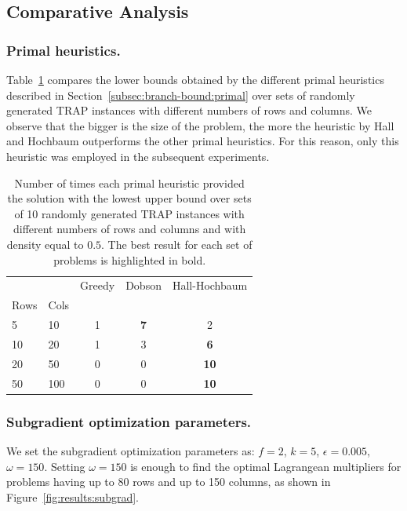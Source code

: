 \documentclass[runningheads]{llncs}
\begin{document}
\subsection{Comparative Analysis}
\label{subsec:results:comparisons}

\subsubsection{Primal heuristics.} Table~\ref{tab:results:primal} compares the lower bounds obtained by the different primal heuristics described in Section~\ref{subsec:branch-bound:primal} over sets of randomly generated TRAP instances with different numbers of rows and columns. We observe that the bigger is the size of the problem, the more the heuristic by Hall and Hochbaum outperforms the other primal heuristics. For this reason, only this heuristic was employed in the subsequent experiments. 

\begin{table}
  \caption{Number of times each primal heuristic provided the solution with the lowest upper bound over sets of 10 randomly generated TRAP instances with different numbers of rows and columns and with density equal to $0.5$. The best result for each set of problems is highlighted in bold.}
  \label{tab:results:primal}
  \centering
  \begin{tabular}{llccc}
  \toprule
   &  & Greedy & Dobson & Hall-Hochbaum \\
  Rows & Cols &  &  &  \\
  \midrule
  5 & 10 & 1 & \bfseries 7 & 2 \\
  10 & 20 & 1 & 3 & \bfseries 6 \\
  20 & 50 & 0 & 0 & \bfseries 10 \\
  50 & 100 & 0 & 0 & \bfseries 10 \\
  \bottomrule
  \end{tabular}
  \end{table}

\subsubsection{Subgradient optimization parameters.} We set the subgradient optimization parameters as: $f=2$, $k=5$, $\epsilon=0.005$, $\omega=150$. Setting $\omega=150$ is enough to find the optimal Lagrangean multipliers for problems having up to 80 rows and up to 150 columns, as shown in Figure~\ref{fig:results:subgrad}.
\end{document}
